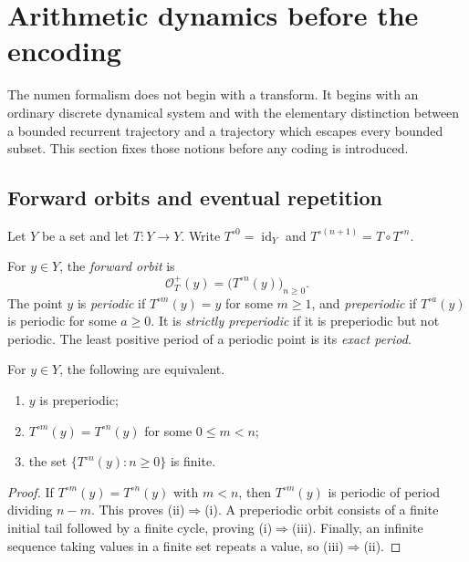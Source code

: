 \section{Arithmetic dynamics before the encoding}
\label{sec:arithmetic-dynamics}

The numen formalism does not begin with a transform.  It begins with an
ordinary discrete dynamical system and with the elementary distinction
between a bounded recurrent trajectory and a trajectory which escapes every
bounded subset.  This section fixes those notions before any coding is
introduced.

\subsection{Forward orbits and eventual repetition}

Let $Y$ be a set and let $T:Y\to Y$.  Write $T^{\circ 0}=\operatorname{id}_Y$
and $T^{\circ(n+1)}=T\circ T^{\circ n}$.

\begin{definition}
For $y\in Y$, the \emph{forward orbit} is
\[
  \mathcal O_T^+(y)=\bigl(T^{\circ n}(y)\bigr)_{n\geq 0}.
\]
The point $y$ is \emph{periodic} if $T^{\circ m}(y)=y$ for some $m\geq1$,
and \emph{preperiodic} if $T^{\circ a}(y)$ is periodic for some $a\geq0$.
It is \emph{strictly preperiodic} if it is preperiodic but not periodic.
The least positive period of a periodic point is its \emph{exact period}.
\end{definition}

\begin{lemma}
\label{lem:eventual-repetition}
For $y\in Y$, the following are equivalent.
\begin{enumerate}[label=\textup{(\roman*)}]
\item $y$ is preperiodic;
\item $T^{\circ m}(y)=T^{\circ n}(y)$ for some $0\leq m<n$;
\item the set $\{T^{\circ n}(y):n\geq0\}$ is finite.
\end{enumerate}
\end{lemma}

\begin{proof}
If $T^{\circ m}(y)=T^{\circ n}(y)$ with $m<n$, then
$T^{\circ m}(y)$ is periodic of period dividing $n-m$.  This proves
(ii)$\Rightarrow$(i).  A preperiodic orbit consists of a finite initial tail
followed by a finite cycle, proving (i)$\Rightarrow$(iii).  Finally, an
infinite sequence taking values in a finite set repeats a value, so
(iii)$\Rightarrow$(ii).
\end{proof}

